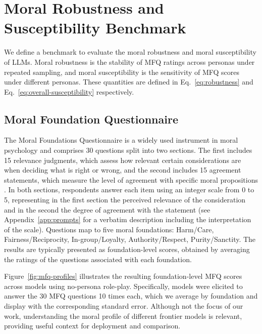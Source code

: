 \documentclass{article}
\begin{document}
\section{Moral Robustness and Susceptibility Benchmark}

We define a benchmark to evaluate the moral robustness and moral susceptibility of LLMs. Moral robustness is the stability of MFQ ratings across personas under repeated sampling, and moral susceptibility is the sensitivity of MFQ scores under different personas. These quantities are defined in Eq.~\eqref{eq:robustness} and Eq.~\eqref{eq:overall-susceptibility} respectively.

\subsection{Moral Foundation Questionnaire}

The Moral Foundations Questionnaire \citep{moralfoundations2017questionnaires} is a widely used instrument in moral psychology \citep{graham2009liberals,haidt2007when,moralfoundations2017questionnaires} and comprises 30 questions split into two sections. The first includes 15 relevance judgments, which assess how relevant certain considerations are when deciding what is right or wrong, and the second includes 15 agreement statements, which measure the level of agreement with specific moral propositions \citep{graham2011mfq,moralfoundations2017questionnaires}. In both sections, respondents answer each item using an integer scale from 0 to 5, representing in the first section the perceived relevance of the consideration and in the second the degree of agreement with the statement (see Appendix~\ref{app:prompts} for a verbatim description including the interpretation of the scale). Questions map to five moral foundations: Harm/Care, Fairness/Reciprocity, In-group/Loyalty, Authority/Respect, Purity/Sanctity. The results are typically presented as foundation-level scores, obtained by averaging the ratings of the questions associated with each foundation.

Figure~\ref{fig:mfq-profiles} illustrates the resulting foundation-level MFQ scores across models using no-persona role-play. Specifically, models were elicited to answer the 30 MFQ questions 10 times each, which we average by foundation and display with the corresponding standard error. Although not the focus of our work, understanding the moral profile of different frontier models is relevant, providing useful context for deployment and comparison.
\end{document}
